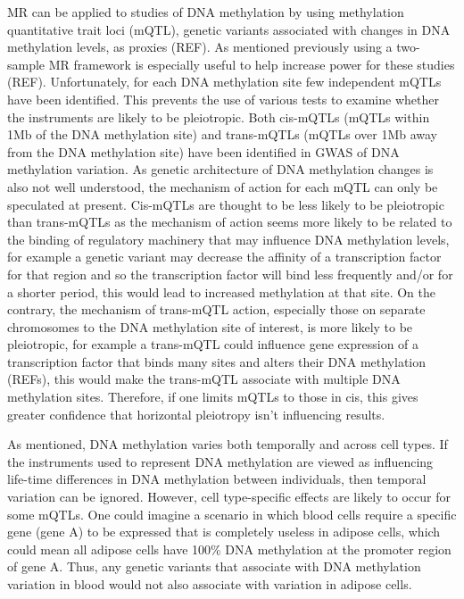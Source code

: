 \documentclass[11pt,twoside]{bristolthesis}
\begin{document}
MR can be applied to studies of DNA methylation by using methylation quantitative trait loci (mQTL), genetic variants associated with changes in DNA methylation levels, as proxies (REF). As mentioned previously using a two-sample MR framework is especially useful to help increase power for these studies (REF). Unfortunately, for each DNA methylation site few independent mQTLs have been identified. This prevents the use of various tests to examine whether the instruments are likely to be pleiotropic. Both cis-mQTLs (mQTLs within 1Mb of the DNA methylation site) and trans-mQTLs (mQTLs over 1Mb away from the DNA methylation site) have been identified in GWAS of DNA methylation variation. As genetic architecture of DNA methylation changes is also not well understood, the mechanism of action for each mQTL can only be speculated at present. Cis-mQTLs are thought to be less likely to be pleiotropic than trans-mQTLs as the mechanism of action seems more likely to be related to the binding of regulatory machinery that may influence DNA methylation levels, for example a genetic variant may decrease the affinity of a transcription factor for that region and so the transcription factor will bind less frequently and/or for a shorter period, this would lead to increased methylation at that site. On the contrary, the mechanism of trans-mQTL action, especially those on separate chromosomes to the DNA methylation site of interest, is more likely to be pleiotropic, for example a trans-mQTL could influence gene expression of a transcription factor that binds many sites and alters their DNA methylation (REFs), this would make the trans-mQTL associate with multiple DNA methylation sites. Therefore, if one limits mQTLs to those in cis, this gives greater confidence that horizontal pleiotropy isn't influencing results.

As mentioned, DNA methylation varies both temporally and across cell types. If the instruments used to represent DNA methylation are viewed as influencing life-time differences in DNA methylation between individuals, then temporal variation can be ignored. However, cell type-specific effects are likely to occur for some mQTLs. One could imagine a scenario in which blood cells require a specific gene (gene A) to be expressed that is completely useless in adipose cells, which could mean all adipose cells have 100\% DNA methylation at the promoter region of gene A. Thus, any genetic variants that associate with DNA methylation variation in blood would not also associate with variation in adipose cells.
\end{document}
